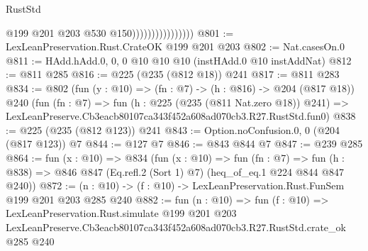 \begin{lexlean}{RustStd}
\begin{coremodule}
                                    @199
                                    @201
                                    @203
                                    @530
                                    @150))))))))))))))))
@801 := LexLeanPreservation.Rust.CrateOK @199 @201 @203
@802 := Nat.casesOn.{0}
@811 := HAdd.hAdd.{0, 0, 0} @10 @10 @10 (instHAdd.{0} @10 instAddNat)
@812 := @811 @285
@816 := @225 (@235 (@812 @18)) @241
@817 := @811 @283
@834 := @802
    (fun (y : @10) => (fn : @7) -> (h : @816) -> @204 (@817 @18))
    @240
    (fun (fn : @7) =>
    fun (h : @225 (@235 (@811 Nat.zero @18)) @241) =>
    LexLeanPreserve.Cb3eacb80107ca343f452a608ad070cb3.R27.RustStd.fun0)
@838 := @225 (@235 (@812 @123)) @241
@843 := Option.noConfusion.{0, 0} (@204 (@817 @123)) @7
@844 := @127 @7
@846 := @843 @844 @7
@847 := @239 @285
@864 := fun (x : @10) =>
  @834
    (fun (x : @10) =>
    fun (fn : @7) =>
    fun (h : @838) => @846 @847 (Eq.refl.{2} (Sort 1) @7) (heq_of_eq.{1} @224 @844 @847 @240))
@872 := (n : @10) -> (f : @10) -> LexLeanPreservation.Rust.FunSem @199 @201 @203 @285 @240
@882 := fun (n : @10) =>
  fun (f : @10) =>
  LexLeanPreservation.Rust.simulate
    @199
    @201
    @203
    LexLeanPreserve.Cb3eacb80107ca343f452a608ad070cb3.R27.RustStd.crate_ok
    @285
    @240
\end{coremodule}
\end{lexlean}
